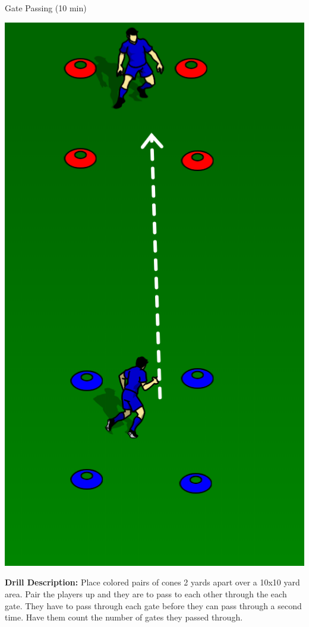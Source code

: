 \begin{oddBlock}{Gate Passing (10 min)}

\begin{minipage}[t]{\linewidth}
    \centering
    
    \begin{minipage}{.3\linewidth} %
            \centering
            \includegraphics[width=.6\textwidth]{../img/Trimmed/Box_Passing}
    \end{minipage}
    \hspace{0.05\linewidth}
    \begin{minipage}{.6\linewidth} %
        \textbf{Drill Description:}
        Place colored pairs of cones 2 yards apart over a 10x10 yard area.  Pair the players up and they are to pass to each other through the each gate.  They have to pass through each gate before they can pass through a second time.  Have them count the number of gates they passed through.
        

\end{minipage}
\end{minipage}
\end{oddBlock}
